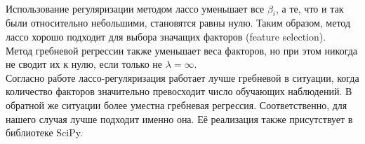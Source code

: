 \documentclass[14pt]{matmex-diploma}
\begin{document}
\\\indent Использование регуляризации методом лассо уменьшает все $\beta_i$, а те, что и так были относительно небольшими, становятся равны нулю. Таким образом, метод лассо хорошо подходит для выбора значащих факторов (feature selection).  
\\\indent Метод гребневой регрессии также уменьшает веса факторов, но при этом никогда не сводит их к нулю, если только не $\lambda = \infty$.
\\\indent Согласно работе \cite{Ng04featureselection} лассо-регуляризация работает лучше гребневой в ситуации, когда количество факторов значительно превосходит число обучающих наблюдений. В обратной же ситуации более уместна гребневая регрессия. Соответственно, для нашего случая лучше подходит именно она. Её реализация также присутствует в библиотеке SciPy.
\end{document}
